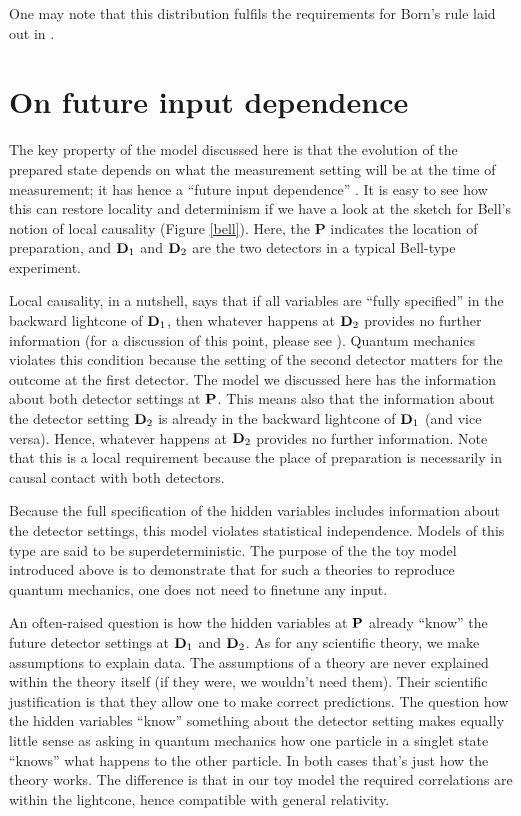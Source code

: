 \documentclass[12pt]{article}
\begin{document}
One may note that this distribution fulfils the requirements for Born's rule laid out in \cite{Hossenfelder:2020gdb}. 

\section{On future input dependence}

The key property of the model discussed here is that the evolution of the prepared state depends on what the measurement setting will be at the time of measurement; it has hence a ``future input dependence''  \cite{Wharton}. It is easy to see how this can restore locality and determinism if we have a look at the sketch for Bell's notion of local causality (Figure  \ref{bell}). Here, the {\bf P} indicates the location of preparation, and ${\bf D}_1$ and ${\bf D}_2$ are the two detectors in a typical Bell-type experiment. 

Local causality, in a nutshell, says that if all variables are ``fully specified'' in the backward lightcone of ${\bf D}_1$, then whatever happens at ${\bf D}_2$ provides no further information (for a discussion of this point, please see \cite{Norsen2011}). Quantum mechanics violates this condition because the setting of the second detector matters for the outcome at the first detector. The model we discussed here has the information about both detector settings at ${\bf P}$. This means also that the information about the detector setting ${\bf D}_2$ is already in the backward lightcone of ${\bf D}_1$ (and vice versa). Hence, whatever happens at ${\bf D}_2$ provides no further information.  Note that this is a local requirement because the place of preparation is necessarily in causal contact with both detectors. 

Because the full specification of the hidden variables includes information about the detector settings, this model violates statistical independence. Models of this type are said to be superdeterministic. The purpose of the the toy model introduced above is to demonstrate that for such a theories to reproduce quantum mechanics, one does not need to finetune any input. 

An often-raised question is how the hidden variables at ${\bf P}$ already ``know'' the future detector settings at ${\bf D}_1$ and ${\bf D}_2$. As for any scientific theory, we make assumptions to explain data. The assumptions of a theory are never explained within the theory itself (if they were, we wouldn't need them). Their scientific justification is that they allow one to make correct predictions. The question how the hidden variables ``know'' something about the detector setting makes equally little sense as asking in quantum mechanics how one particle in a singlet state ``knows'' what happens to the other particle. In both cases that's just how the theory works. The difference is that in our toy model the required correlations are within the lightcone, hence compatible with general relativity.
\end{document}
